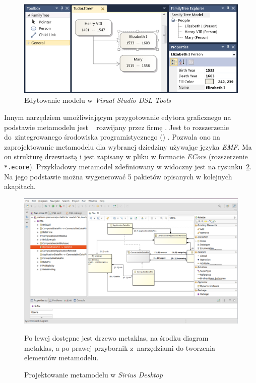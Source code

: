\begin{figure}[!ht]
	\centering

	\includegraphics[width=0.95\linewidth]{./images/visual-studio-dsl-example.png}
	\caption{Edytowanie modelu w \emph{Visual Studio DSL
			Tools}}\label{rys:visual-studio-dsl-example}
\end{figure}

Innym narzędziem umożliwiającym przygotowanie edytora graficznego na podstawie
metamodelu jest \SiriusDesktop{}~\cite{sirius-desktop-homepage} rozwijany
przez firmę \Eclipse{}. Jest to rozszerzenie do~zintegrowanego środowiska
programistycznego () \Eclipse{}. Pozwala ono na zaprojektowanie
metamodelu dla wybranej dziedziny używając języka \emph{\acrfull{EMF}}. Ma on
strukturę drzewiastą i jest
zapisany w pliku  w formacie \emph{ECore} (rozszerzenie
\texttt{*.ecore}). Przykładowy metamodel zdefiniowany w \SiriusDesktop{}
widoczny jest na rysunku~\ref{rys:sirius-desktop-example-metamodel}. Na jego
podstawie można wygenerować 5 pakietów opisanych w kolejnych akapitach.

\begin{figure}[!hb]
	\centering

	\includegraphics[width=0.95\linewidth]{./images/sirius-desktop-metamodel.png}
	\caption{Projektowanie metamodelu w \emph{Sirius
			Desktop}}\label{rys:sirius-desktop-example-metamodel}
	\medskip
	{\small Po lewej dostępne jest drzewo metaklas, na środku diagram
		metaklas, a po prawej przybornik z~narzędziami do tworzenia
		elementów metamodelu.}
\end{figure}

